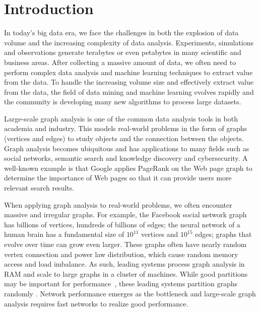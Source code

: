 \chapter{Introduction}
\label{sec:intro}

In today's big data era, we face the challenges in both the explosion of
data volume and the increasing complexity of data analysis. Experiments,
simulations and observations generate terabytes or
even petabytes in many scientific and business areas. After collecting
a massive amount of data, we often need to perform complex data analysis
and machine learning techniques to extract value from the data. To handle
the increasing volume size and effectively extract value from the data,
the field of data mining and machine learning evolves rapidly and the community
is developing many new algorithms to process large datasets.

Large-scale graph analysis is one of the common data analysis tools in both
academia and industry. This models
real-world problems in the form of graphs (vertices and edges) to study objects
and the connection between the objects. Graph analysis becomes ubiquitous
and has applications to many fields such as social networks, semantic search
and knowledge discovery and cybersecurity. A well-known example is that Google
applies PageRank \cite{pagerank} on the Web page graph to determine the importance
of Web pages so that it can provide users more relevant search results.

When applying graph analysis to real-world problems, we often encounter
massive and irregular graphs. For example, the Facebook social network graph
has billions of vertices, hundreds of billions of edges; the neural network
of a human brain has a fundamental size of $10^{11}$ vertices and $10^{15}$ edges;
graphs that evolve over time can grow even larger. These graphs often have
nearly random vertex connection and power law distribution, which cause random
memory access and load imbalance. As such, leading systems process graph analysis
in RAM and scale to large graphs in a cluster of machines. While good partitions
may be important for performance~\cite{surfer}, these leading systems partition
graphs randomly \cite{powergraph}. Network performance emerges as the bottleneck
and large-scale graph analysis requires fast networks to realize good performance.

